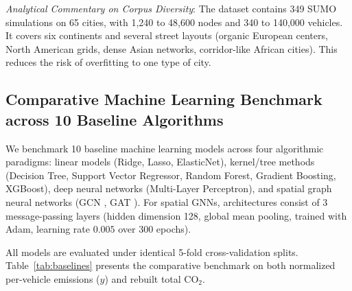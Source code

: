 \documentclass[journal]{IEEEtran}
\begin{document}
\textit{Analytical Commentary on Corpus Diversity}:
The dataset contains 349 SUMO simulations on 65 cities, with 1,240 to 48,600 nodes and 340 to 140,000 vehicles. It covers six continents and several street layouts (organic European centers, North American grids, dense Asian networks, corridor-like African cities). This reduces the risk of overfitting to one type of city.

\subsection{Comparative Machine Learning Benchmark across 10 Baseline Algorithms}
\label{subsec:baselines}
We benchmark 10 baseline machine learning models across four algorithmic paradigms: linear models (Ridge, Lasso, ElasticNet), kernel/tree methods (Decision Tree, Support Vector Regressor, Random Forest, Gradient Boosting, XGBoost), deep neural networks (Multi-Layer Perceptron), and spatial graph neural networks (GCN \cite{Kipf2017}, GAT \cite{Velickovic2018}). For spatial GNNs, architectures consist of 3 message-passing layers (hidden dimension 128, global mean pooling, trained with Adam, learning rate $0.005$ over 300 epochs).

All models are evaluated under identical 5-fold cross-validation splits. Table~\ref{tab:baselines} presents the comparative benchmark on both normalized per-vehicle emissions ($y$) and rebuilt total $\text{CO}_2$.
\end{document}
